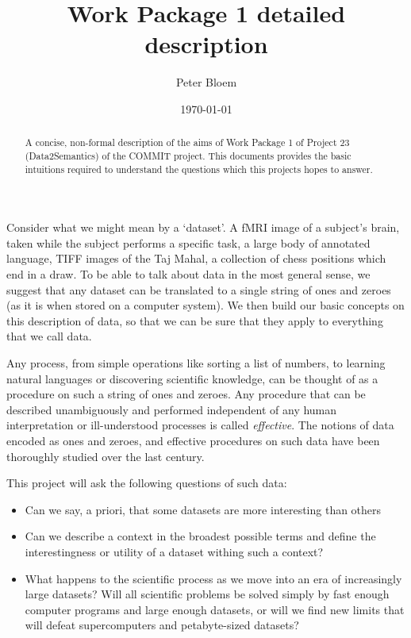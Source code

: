\documentclass{article}
\title{Work Package 1 detailed description}
\date{\today}
\author{Peter Bloem}
\begin{document}
\maketitle

\begin{abstract}
A concise, non-formal description of the aims of Work Package 1 of Project 23
(Data2Semantics) of the COMMIT project. This documents provides the basic
intuitions required to understand the questions which this projects hopes to
answer.
\end{abstract}

Consider what we might mean by a `dataset'. A fMRI image of a subject's brain,
taken while the subject performs a specific task, a large body of annotated
language, TIFF images of the Taj Mahal, a collection of chess positions which
end in a draw. To be able to talk about data in the most general sense, we
suggest that any dataset can be translated to a single string of ones and zeroes
(as it is when stored on a computer system). We then build our basic concepts on
this description of data, so that we can be sure that they apply to everything
that we call data.

Any process, from simple operations like sorting a list of numbers, to learning
natural languages or discovering scientific knowledge, can be thought of as a
procedure on such a string of ones and zeroes. Any procedure that can be
described unambiguously and performed independent of any human interpretation or
ill-understood processes is called \emph{effective}. The notions of data encoded
as ones and zeroes, and effective procedures on such data have been thoroughly
studied over the last century.


This project will ask the following questions of such data:
\begin{itemize}
  \item Can we say, a priori, that some datasets are more interesting than
  others
  \item Can we describe a context in the broadest possible terms and define
  the interestingness or utility of a dataset withing such a context?
  \item What happens to the scientific process as we move into an era of
  increasingly large datasets? Will all scientific problems be solved simply by
  fast enough computer programs and large enough datasets, or will we find new
  limits that will defeat supercomputers and petabyte-sized datasets?
\end{itemize}
\end{document}
